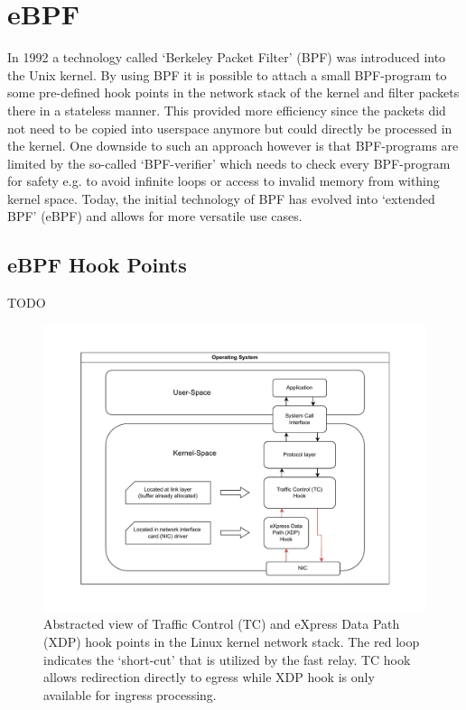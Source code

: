 \section{eBPF}\label{sec:ebpf_bg}
In 1992 a technology called `Berkeley Packet Filter' (BPF) was introduced into 
the Unix kernel.
By using BPF it is possible to attach a small BPF-program to some pre-defined hook points in 
the network stack of the kernel and filter packets there in a stateless manner.
This provided more efficiency since the packets did not need to be copied into 
userspace anymore but could directly be processed in the kernel.
One downside to such an approach however is that BPF-programs are limited by the 
so-called `BPF-verifier' which needs to check every BPF-program for safety e.g. 
to avoid infinite loops or access to invalid memory from withing kernel space. 
Today, the initial technology of BPF has evolved into `extended BPF' (eBPF) and 
allows for more versatile use cases.

\subsection{eBPF Hook Points}
TODO

\begin{figure}[htbp]
    \centering
    \includegraphics[width=\textwidth]{figures/02_background/ebpf-hooks.drawio.pdf}
    \caption{Abstracted view of Traffic Control (TC) and eXpress Data Path (XDP) hook points
    in the Linux kernel network stack.
    The red loop indicates the `short-cut' that is utilized by the fast relay.
    TC hook allows redirection directly to egress while XDP hook is only available
    for ingress processing.
    }\label{fig:ebpf-hooks}
\end{figure}

